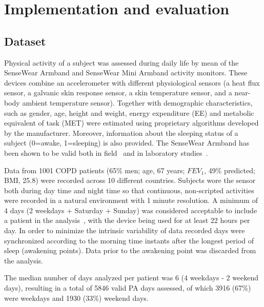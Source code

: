\section{Implementation and evaluation}
\subsection{Dataset}
Physical activity of a subject was assessed during daily life by mean of the SenseWear Armband and SenseWear Mini Armband activity monitors. 
These devices combine an accelerometer with different physiological sensors (a heat flux sensor, a galvanic skin response sensor, 
a skin temperature sensor, and a near-body ambient temperature sensor).  Together with demographic characteristics, such as gender, 
age, height and weight, energy expenditure (EE) and metabolic equivalent of task (MET) were estimated using proprietary algorithms 
developed by the manufacturer. Moreover, information about the sleeping status of a subject (0=awake, 1=sleeping) is also provided. 
The SenseWear Armband has been shown to be valid both in field~\cite{Colbert_2011,Mackey_2011} and in laboratory 
studies~\cite{Furlanetto_2010,Hill_2010,Cavalheri_2011}.
\par Data from 1001 COPD patients (65\% men; age, 67 years; $FEV_{1}$, 49\% predicted; BMI, 25.8) were recorded across 10 different countries. Subjects wore the sensor both during day time and night time so that continuous, non-scripted activities were recorded in a natural environment with 1 minute resolution. 
A minimum of 4 days (2 weekdays + Saturday + Sunday) was considered acceptable to include a patient in the analysis~\cite{Watz_2009}, with the device 
being used for at least 22 hours per day. 
In order to minimize the intrinsic variability of data 
recorded days were synchronized according to the morning time instants after the longest period of sleep (awakening points). Data prior to the awakening point was discarded from the analysis.
\par The median number of days analyzed per patient was 6 (4 weekdays - 2 weekend days), resulting in a total of 5846 valid PA days assessed, of which 3916 (67\%) were weekdays and 1930 (33\%) weekend days.
